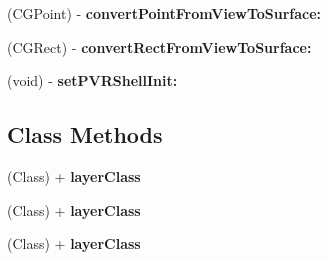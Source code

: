 \begin{DoxyCompactItemize}
\item 
\hypertarget{interface_e_a_g_l_view_ae823254f5a51c1802b4f0cdb5509038f}{(C\+G\+Point) -\/ {\bfseries convert\+Point\+From\+View\+To\+Surface\+:}}\label{interface_e_a_g_l_view_ae823254f5a51c1802b4f0cdb5509038f}

\item 
\hypertarget{interface_e_a_g_l_view_acb05d84c18cfeb72fa1e8d78661047f9}{(C\+G\+Rect) -\/ {\bfseries convert\+Rect\+From\+View\+To\+Surface\+:}}\label{interface_e_a_g_l_view_acb05d84c18cfeb72fa1e8d78661047f9}

\item 
\hypertarget{interface_e_a_g_l_view_a0904d387018e677fd9ab30c8b38f552c}{(void) -\/ {\bfseries set\+P\+V\+R\+Shell\+Init\+:}}\label{interface_e_a_g_l_view_a0904d387018e677fd9ab30c8b38f552c}

\end{DoxyCompactItemize}
\subsection*{Class Methods}
\begin{DoxyCompactItemize}
\item 
\hypertarget{interface_e_a_g_l_view_ae2da2579ee5cec90be82e209697ec4c7}{(Class) + {\bfseries layer\+Class}}\label{interface_e_a_g_l_view_ae2da2579ee5cec90be82e209697ec4c7}

\item 
\hypertarget{interface_e_a_g_l_view_ae2da2579ee5cec90be82e209697ec4c7}{(Class) + {\bfseries layer\+Class}}\label{interface_e_a_g_l_view_ae2da2579ee5cec90be82e209697ec4c7}

\item 
\hypertarget{interface_e_a_g_l_view_ae2da2579ee5cec90be82e209697ec4c7}{(Class) + {\bfseries layer\+Class}}\label{interface_e_a_g_l_view_ae2da2579ee5cec90be82e209697ec4c7}

\end{DoxyCompactItemize}
